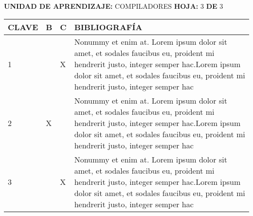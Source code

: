 \documentclass[10pt]{article}
\newcommand\tab[1][1cm]{\hspace*{#1}}
\begin{document}
\textbf{UNIDAD DE APRENDIZAJE:} COMPILADORES
\tab[1cm]
\textbf{HOJA:} 3
\tab[0.25cm]
\textbf{DE} 3\\

\begin{table}[H]
  \begin{tabular}{|p{}|p{}|p{}|p{}|}
    \hline

    \textbf{CLAVE} & \textbf{B} & \textbf{C} & \textbf{BIBLIOGRAFÍA}\\\hline
    1 &  & X & Nonummy et enim at. Lorem ipsum dolor sit amet, et sodales faucibus eu, proident mi hendrerit justo, integer semper hac.Lorem ipsum dolor sit amet, et sodales faucibus eu, proident mi hendrerit justo, integer semper hac\\
    2 & X &  & Nonummy et enim at. Lorem ipsum dolor sit amet, et sodales faucibus eu, proident mi hendrerit justo, integer semper hac.Lorem ipsum dolor sit amet, et sodales faucibus eu, proident mi hendrerit justo, integer semper hac\\
    3 &  & X & Nonummy et enim at. Lorem ipsum dolor sit amet, et sodales faucibus eu, proident mi hendrerit justo, integer semper hac.Lorem ipsum dolor sit amet, et sodales faucibus eu, proident mi hendrerit justo, integer semper hac\\

    \hline
  \end{tabular}
\end{table}

\end{document}
